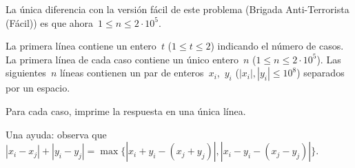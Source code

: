 
La única diferencia con la versión fácil de este problema (Brigada Anti-Terrorista
(Fácil)) es que ahora~$1 \leq n \leq 2 \cdot 10^5$.


La primera línea contiene un entero~$t$ ($1 \leq t \leq 2$) indicando el número de
casos. La primera línea de cada caso contiene un único entero~$n$
($1 \leq n \leq 2 \cdot 10^5$). Las siguientes~$n$ líneas contienen un par de
enteros~$x_i$,~$y_i$ ($|x_i|, |y_i| \leq 10^8$) separados por un espacio.

\outputText

Para cada caso, imprime la respuesta en una única línea.

\exampleCases

\begin{example}
\end{example}

\explanationText

Una ayuda: observa
que~$|x_i - x_j| + |y_i - y_j| = \max \{|x_i + y_i - (x_j + y_j)|, |x_i - y_i - (x_j -
y_j)| \}$.
